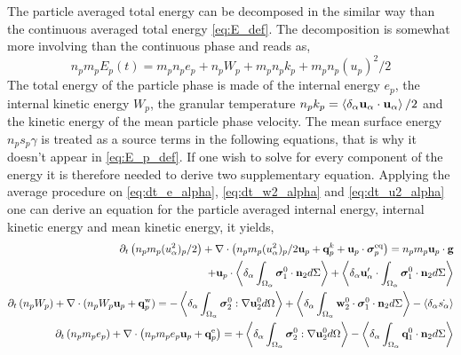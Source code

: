 The particle averaged total energy can be decomposed in the similar way than the continuous averaged total energy \ref{eq:E_def}. 
The decomposition is somewhat more involving than the continuous phase and reads as, 
\begin{equation*}
    n_p m_p E_p(t) 
    = m_p n_p e_p 
    + n_p W_p
    + m_p n_p k_p
    + m_p n_p (u_p)^2/2
    \label{eq:E_p_def}
\end{equation*}
The total energy of the particle phase is made of the internal energy $e_p$, the internal kinetic energy $W_p$, the granular temperature $n_p k_p =\left<\delta_\alpha \textbf{u}_\alpha \cdot\textbf{u}_\alpha\right>/2$ and the kinetic energy of the mean particle phase velocity. 
The mean surface energy $n_p s_p \gamma$ is treated as a source terms in the following equations, that is why it doesn't appear in \ref{eq:E_p_def}.  
If one wish to solve for every component of the energy it is therefore needed to derive two supplementary equation. 
Applying the average procedure on \ref{eq:dt_e_alpha}, \ref{eq:dt_w2_alpha} and \ref{eq:dt_u2_alpha} one can derive an equation for the particle averaged internal energy, internal kinetic energy and mean kinetic energy, it yields, 
\begin{align}
    \label{eq:dt_hybrid_u2p}
    \partial_t \left(n_p m_p (u_\alpha^2)_p/ 2\right)
    + \mathbf{\nabla}\cdot \left(n_p
    m_p (u_\alpha^2)_p/ 2 \textbf{u}_p 
    + \textbf{q}^k_p
    + \textbf{u}_p \cdot \bm{\sigma}_p^\text{eq}
    \right)
    = 
    n_p m_p \textbf{u}_p \cdot
    \textbf{g}\nonumber\\  
    + \textbf{u}_p\cdot\left<\delta_\alpha \int_{\Omega_\alpha} {\bm{\sigma}_1^0 \cdot \textbf{n}_2} d\Sigma\right>
    + \left<\delta_\alpha \textbf{u}_\alpha'\cdot\int_{\Omega_\alpha} \bm{\sigma}_1^0 \cdot \textbf{n}_2 d\Sigma\right>
    \\
    \label{eq:dt_hybrid_Wp}
    \partial_t \left(n_p W_p\right)
    + \mathbf{\nabla}\cdot 
    (n_p W_p
    \textbf{u}_p 
    +  \textbf{q}_p^\text{w}
    )
    = 
    - \left<\delta_\alpha \int_{\Omega_\alpha} {\bm{\sigma}_2^0 : \mathbf{\nabla}\textbf{u}_2^0} d\Omega\right>
    + \left<\delta_\alpha \int_{\Omega_\alpha} {\textbf{w}_2^0 \cdot \bm{\sigma}_1^0 \cdot  \textbf{n}_2} d\Sigma\right>
    - \left<\delta_\alpha \dot{ s_\alpha}\right>
    \\
    \partial_t \left(n_p m_p e_p\right)
    + \mathbf{\nabla}\cdot \left(n_p
    m_p e_p \textbf{u}_p 
    +  \textbf{q}_p^\text{e}
    \right)
    = 
    + \left<\delta_\alpha \int_{\Omega_\alpha} {\bm{\sigma}_2^0 : \mathbf{\nabla}\textbf{u}_2^0} d\Omega\right>
    - \left<\delta_\alpha \int_{\Omega_\alpha} {\textbf{q}_1^0\cdot \textbf{n}_2} d\Sigma\right>
    \label{eq:dt_hybrid_ep}
\end{align}
